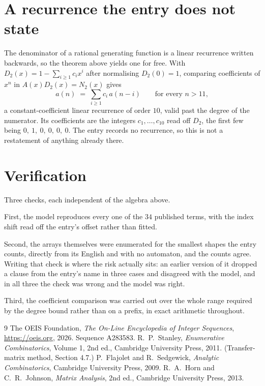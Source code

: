 \documentclass[11pt,a4paper]{article}
\theoremstyle{plain}
\theoremstyle{definition}
\begin{document}
\section{A recurrence the entry does not state}

The denominator of a rational generating function is a linear recurrence written backwards, so
the theorem above yields one for free. With $D_2(x)=1-\sum_{i\ge1}c_ix^i$ after normalising
$D_2(0)=1$, comparing coefficients of $x^n$ in $A(x)D_2(x)=N_2(x)$ gives
\[
a(n)\;=\;\sum_{i\ge1}c_i\,a(n-i)\qquad\text{for every }n>11,
\]
a constant-coefficient linear recurrence of order $10$, valid past the degree of the
numerator. Its coefficients are the integers $c_1,\dots,c_{10}$ read off $D_2$, the first few being $0,\ 1,\ 0,\ 0,\ 0,\ 0$. The entry records no recurrence, so this is not a restatement of anything
already there.

\section{Verification}

Three checks, each independent of the algebra above.

First, the model reproduces every one of the $34$ published terms, with the index shift
read off the entry's offset rather than fitted.

Second, the arrays themselves were enumerated for the smallest shapes the entry counts,
directly from its English and with no automaton, and the counts agree. Writing that check is
where the risk actually sits: an earlier version of it dropped a clause from the entry's name
in three cases and disagreed with the model, and in all three the check was wrong and the model
was right.

Third, the coefficient comparison was carried out over the whole range required by the degree
bound rather than on a prefix, in exact arithmetic throughout.

\begin{thebibliography}{9}
 The OEIS Foundation, \emph{The On-Line Encyclopedia of Integer
Sequences}, \url{https://oeis.org}, 2026. Sequence A283583.
 R.~P.~Stanley, \emph{Enumerative Combinatorics}, Volume 1, 2nd ed.,
Cambridge University Press, 2011. (Transfer-matrix method, Section 4.7.)
 P.~Flajolet and R.~Sedgewick, \emph{Analytic Combinatorics}, Cambridge
University Press, 2009.
 R.~A.~Horn and C.~R.~Johnson, \emph{Matrix Analysis}, 2nd ed., Cambridge
University Press, 2013.
\end{thebibliography}
\end{document}
